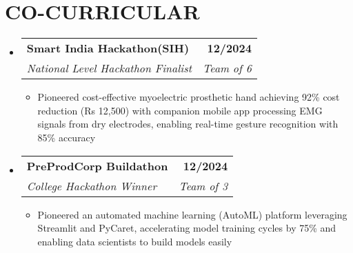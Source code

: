 \documentclass[letterpaper,11pt]{article}
\makeatletter
\def\spaceBelowEdSec{-8pt}
\def\spaceBelowTechSecContent{-8pt}
\def\spaceBetweenResumeItems{-4pt}
\def\spaceBetweenSubheadings{-1pt}
\def\spaceAfterSubheading{-7pt}
\newcommand{\resumeItem}[1]{
  \item\small{
    {#1 \vspace{\spaceBetweenResumeItems}}
  }
}
\newcommand{\resumeSubheading}[4]{
  \vspace{\spaceBetweenSubheadings}\item
    \begin{tabular*}{1.0\textwidth}[t]{l@{\extracolsep{\fill}}r}
      \textbf{\normalsize#1} & \textbf{\small #2} \\
      \textit{\normalsize#3} & \textit{\small #4} \\
    \end{tabular*}\vspace{\spaceAfterSubheading}
}
\newcommand{\resumeSubHeadingListStart}{\begin{itemize}[leftmargin=0.0in, label={}]}
\newcommand{\resumeSubHeadingListEnd}{\end{itemize}\vspace{\spaceBelowEdSec}}
\newcommand{\resumeItemListStart}{\begin{itemize}[leftmargin=0.1in]}
\newcommand{\resumeItemListEnd}{\end{itemize}\vspace{\spaceBelowTechSecContent}}
\makeatother
\begin{document}
\section{{CO-CURRICULAR }}
\resumeSubHeadingListStart
    \resumeSubheading
      {Smart India Hackathon(SIH)}{12/2024}
      {National Level Hackathon Finalist}{Team of 6}
      \resumeItemListStart
        \resumeItem{Pioneered cost-effective myoelectric prosthetic hand achieving 92\% cost reduction (Rs 12,500) with companion mobile app processing EMG signals from dry electrodes, enabling real-time gesture recognition with 85\% accuracy}
      \resumeItemListEnd
\vspace{8pt}
      \resumeSubheading
      {PreProdCorp Buildathon}{12/2024}
      {College Hackathon Winner}{Team of 3}
      \resumeItemListStart
        \resumeItem{Pioneered an automated machine learning (AutoML) platform leveraging Streamlit and PyCaret, accelerating model training cycles by 75\% and enabling data scientists to build models easily}
      \resumeItemListEnd
\resumeSubHeadingListEnd
\end{document}
